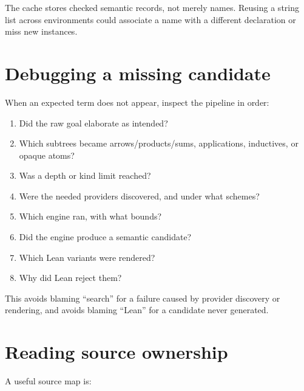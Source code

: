 \documentclass[10pt,letterpaper,oneside,openany]{report}
\begin{document}
The cache stores checked semantic records, not merely names.  Reusing a string list across environments could associate a name with a different declaration or miss new instances.

\section{Debugging a missing candidate}

When an expected term does not appear, inspect the pipeline in order:

\begin{enumerate}
\item Did the raw goal elaborate as intended?
\item Which subtrees became arrows/products/sums, applications, inductives, or opaque atoms?
\item Was a depth or kind limit reached?
\item Were the needed providers discovered, and under what schemes?
\item Which engine ran, with what bounds?
\item Did the engine produce a semantic candidate?
\item Which Lean variants were rendered?
\item Why did Lean reject them?
\end{enumerate}

This avoids blaming ``search'' for a failure caused by provider discovery or rendering, and avoids blaming ``Lean'' for a candidate never generated.

\section{Reading source ownership}

A useful source map is:
\end{document}
